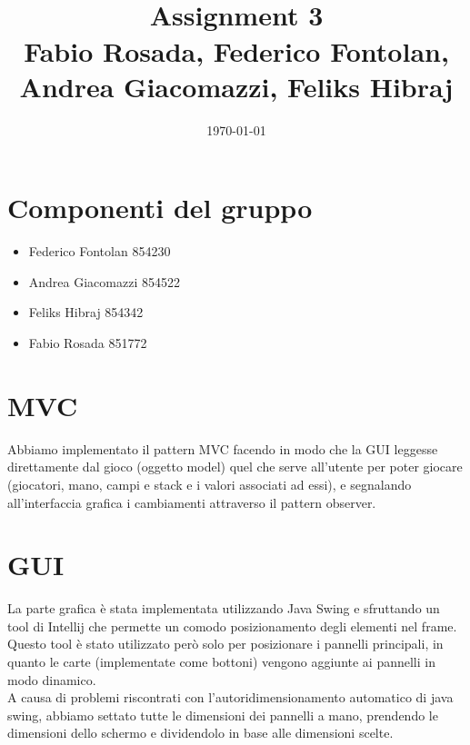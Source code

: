 \documentclass[a4paper]{article}
\title{\groupname\\Assignment 3\\Fabio Rosada, Federico Fontolan, Andrea Giacomazzi, Feliks Hibraj}
\date{\today}
\begin{document}
	
	
	

	\maketitle
	
	\newpage
	\tableofcontents	
	
	
	\section{Componenti del gruppo}
	\begin{itemize}[label={$\bullet$}]
		\item Federico Fontolan 854230
		\item Andrea Giacomazzi 854522
		\item Feliks Hibraj 854342
		\item Fabio Rosada 851772
	\end{itemize}
	
	\newpage
	
	\section{MVC}
	Abbiamo implementato il pattern MVC facendo in modo che la GUI leggesse direttamente dal gioco (oggetto model) quel che serve all'utente per poter giocare (giocatori, mano, campi e stack e i valori associati ad essi), e segnalando all'interfaccia grafica i cambiamenti attraverso il pattern observer.\\


	\section{GUI}
	La parte grafica è stata implementata utilizzando Java Swing e sfruttando un tool di Intellij che permette un comodo posizionamento degli elementi nel frame. Questo tool è stato utilizzato però solo per posizionare i pannelli principali, in quanto le carte (implementate come bottoni) vengono aggiunte ai pannelli in modo dinamico.\\
	A causa di problemi riscontrati con l'autoridimensionamento automatico di java swing, abbiamo settato tutte le dimensioni dei pannelli a mano, prendendo le dimensioni dello schermo e dividendolo in base alle dimensioni scelte.
\end{document}
